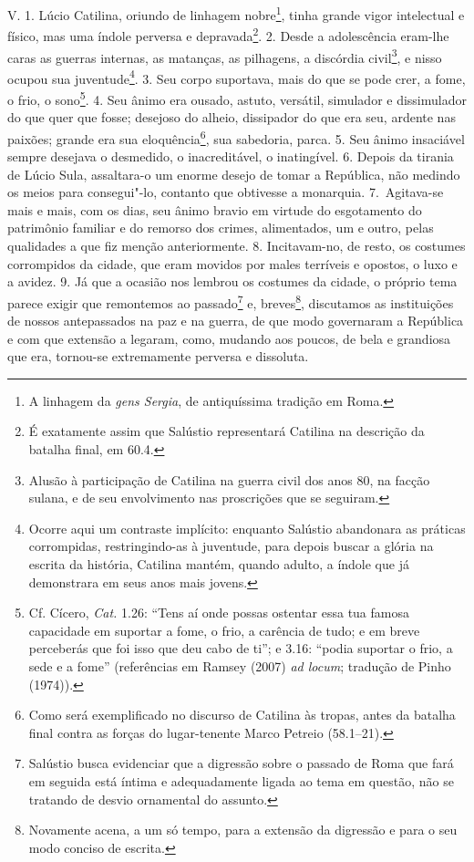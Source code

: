 V. 1. Lúcio Catilina, oriundo de linhagem nobre\footnote{A linhagem da
\emph{gens Sergia}, de antiquíssima tradição em Roma.}, tinha grande vigor
intelectual e físico, mas uma índole perversa e depravada\footnote{É exatamente
assim que Salústio representará Catilina na descrição da batalha final, em 60.4.}. 2. Desde a adolescência eram-lhe caras as guerras internas, as matanças,
as pilhagens, a discórdia civil\footnote{Alusão à participação de Catilina na
guerra civil dos anos 80, na facção sulana, e de seu envolvimento nas
proscrições que se seguiram.}, e nisso ocupou sua juventude\footnote{Ocorre
aqui um contraste implícito: enquanto Salústio abandonara as práticas
corrompidas, restringindo-as à juventude, para depois buscar a glória na
escrita da história, Catilina mantém, quando adulto, a índole que já
demonstrara em seus anos mais jovens.}. 3. Seu corpo suportava, mais do que se
pode crer, a fome, o frio, o sono\footnote{Cf. Cícero, \emph{Cat.} 1.26:  ``Tens aí onde possas ostentar essa tua famosa capacidade em suportar a
fome, o frio, a carência de tudo; e em breve perceberás que foi isso que deu
cabo de ti''; e 3.16: ``podia suportar o frio, a sede e a fome'' (referências
em Ramsey (2007) \emph{ad locum}; tradução de Pinho (1974)).}. 4. Seu ânimo era
ousado, astuto, versátil, simulador e dissimulador do que quer que fosse;
desejoso do alheio, dissipador do que era seu, ardente nas paixões; grande era
sua eloquência\footnote{Como será exemplificado no
discurso de Catilina às tropas, antes da batalha final contra as forças do
lugar-tenente Marco Petreio (58.1--21).}, sua sabedoria, parca. 5. Seu ânimo insaciável sempre
desejava o desmedido, o inacreditável, o inatingível. 6. Depois da tirania de
Lúcio Sula, assaltara-o um enorme desejo de tomar a República, não medindo os
meios para consegui"-lo, contanto que obtivesse a monarquia. 7.~Agitava-se mais
e mais, com os dias, seu ânimo bravio em virtude do esgotamento do patrimônio
familiar e do remorso dos crimes, alimentados, um e outro, pelas qualidades a
que fiz menção anteriormente. 8. Incitavam-no, de resto, os costumes
corrompidos da cidade, que eram movidos por males terríveis e opostos, o luxo e
a avidez. 9. Já que a ocasião nos lembrou os costumes da cidade, o próprio tema
parece exigir que remontemos ao passado\footnote{Salústio busca evidenciar que
a digressão sobre o passado de Roma que fará em seguida está íntima e
adequadamente ligada ao tema em questão, não se tratando de desvio ornamental
do assunto.} e, breves\footnote{Novamente acena, a um só tempo, para a extensão
da digressão e para o seu modo conciso de escrita.}, discutamos as instituições
de nossos antepassados na paz e na guerra, de que modo governaram a República e
com que extensão a legaram, como, mudando aos poucos, de bela e grandiosa que
era, tornou-se extremamente perversa e dissoluta.

